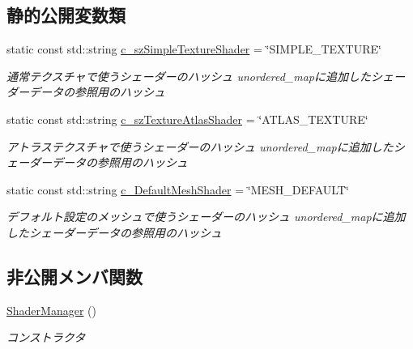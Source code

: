 \subsection*{静的公開変数類}
\begin{DoxyCompactItemize}
\item 
static const std\+::string \hyperlink{class_d3_d11_1_1_graphic_1_1_shader_manager_a40c965cdd249ce2492b6f554987c9c71}{c\+\_\+sz\+Simple\+Texture\+Shader} = \char`\"{}S\+I\+M\+P\+L\+E\+\_\+\+T\+E\+X\+T\+U\+RE\char`\"{}
\begin{DoxyCompactList}\small\item\em 通常テクスチャで使うシェーダーのハッシュ  unordered\+\_\+mapに追加したシェーダーデータの参照用のハッシュ \end{DoxyCompactList}\item 
static const std\+::string \hyperlink{class_d3_d11_1_1_graphic_1_1_shader_manager_af418a1f0ddd33cf8dd7765f88c05aa3b}{c\+\_\+sz\+Texture\+Atlas\+Shader} = \char`\"{}A\+T\+L\+A\+S\+\_\+\+T\+E\+X\+T\+U\+RE\char`\"{}
\begin{DoxyCompactList}\small\item\em アトラステクスチャで使うシェーダーのハッシュ  unordered\+\_\+mapに追加したシェーダーデータの参照用のハッシュ \end{DoxyCompactList}\item 
static const std\+::string \hyperlink{class_d3_d11_1_1_graphic_1_1_shader_manager_ad1607cbc05176bb70e3699dd651b4674}{c\+\_\+\+Default\+Mesh\+Shader} = \char`\"{}M\+E\+S\+H\+\_\+\+D\+E\+F\+A\+U\+LT\char`\"{}
\begin{DoxyCompactList}\small\item\em デフォルト設定のメッシュで使うシェーダーのハッシュ  unordered\+\_\+mapに追加したシェーダーデータの参照用のハッシュ \end{DoxyCompactList}\end{DoxyCompactItemize}
\subsection*{非公開メンバ関数}
\begin{DoxyCompactItemize}
\item 
\hyperlink{class_d3_d11_1_1_graphic_1_1_shader_manager_a2dbca1784769d0a8bdfdd0c86a85464b}{Shader\+Manager} ()\hypertarget{class_d3_d11_1_1_graphic_1_1_shader_manager_a2dbca1784769d0a8bdfdd0c86a85464b}{}\label{class_d3_d11_1_1_graphic_1_1_shader_manager_a2dbca1784769d0a8bdfdd0c86a85464b}

\begin{DoxyCompactList}\small\item\em コンストラクタ \end{DoxyCompactList}\end{DoxyCompactItemize}
